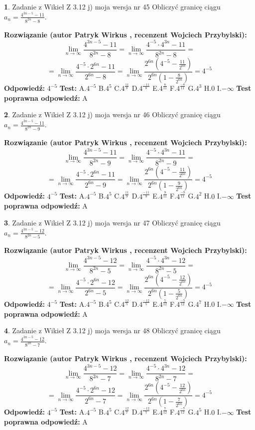 \documentclass[12pt, a4paper]{article}
\theoremstyle{definition} %
\newtheorem{zad}{}
\newcommand{\zadStart}[1]{\begin{zad}#1\newline}
\newcommand{\zadStop}{\end{zad}}
\newcommand{\rozwStart}[2]{\noindent \textbf{Rozwiązanie (autor #1 , recenzent #2): }\newline}
\newcommand{\rozwStop}{\newline}
\newcommand{\odpStart}{\noindent \textbf{Odpowiedź:}\newline}
\newcommand{\odpStop}{\newline}
\newcommand{\testStart}{\noindent \textbf{Test:}\newline}
\newcommand{\testStop}{\newline}
\newcommand{\kluczStart}{\noindent \textbf{Test poprawna odpowiedź:}\newline}
\newcommand{\kluczStop}{\newline}
\begin{document}
\zadStart{Zadanie z Wikieł Z 3.12 j) moja wersja nr 45}
Obliczyć granicę ciągu $a_{n}=\frac{4^{3n-5}-11}{8^{2n}-8}$.
\zadStop
\rozwStart{Patryk Wirkus}{Wojciech Przybylski}
$$\lim\limits_{n\to\infty}\frac{4^{3n-5}-11}{8^{2n}-8}= \lim\limits_{n\to\infty}\frac{4^{-5} \cdot 4^{3n}-11}{8^{2n}-8}=$$
$$= \lim\limits_{n\to\infty}\frac{4^{-5} \cdot 2^{6n}-11}{2^{6n}-8}= \lim\limits_{n\to\infty}\frac{2^{6n}(4^{-5} - \frac{11}{2^{6n}})}{2^{6n}(1-\frac{8}{2^{6n}})}= 4^{-5}$$
\rozwStop
\odpStart
$4^{-5}$
\odpStop
\testStart
A.$4^{-5}$
B.$4^{5}$
C.$4^{\frac{11}{8}}$
D.$4^{\frac{-11}{8}}$
E.$4^{\frac{8}{11}}$
F.$4^{\frac{-8}{11}}$
G.$4^{3}$
H.$0$
I.$-\infty$
\testStop
\kluczStart
A
\kluczStop



\zadStart{Zadanie z Wikieł Z 3.12 j) moja wersja nr 46}
Obliczyć granicę ciągu $a_{n}=\frac{4^{3n-5}-11}{8^{2n}-9}$.
\zadStop
\rozwStart{Patryk Wirkus}{Wojciech Przybylski}
$$\lim\limits_{n\to\infty}\frac{4^{3n-5}-11}{8^{2n}-9}= \lim\limits_{n\to\infty}\frac{4^{-5} \cdot 4^{3n}-11}{8^{2n}-9}=$$
$$= \lim\limits_{n\to\infty}\frac{4^{-5} \cdot 2^{6n}-11}{2^{6n}-9}= \lim\limits_{n\to\infty}\frac{2^{6n}(4^{-5} - \frac{11}{2^{6n}})}{2^{6n}(1-\frac{9}{2^{6n}})}= 4^{-5}$$
\rozwStop
\odpStart
$4^{-5}$
\odpStop
\testStart
A.$4^{-5}$
B.$4^{5}$
C.$4^{\frac{11}{9}}$
D.$4^{\frac{-11}{9}}$
E.$4^{\frac{9}{11}}$
F.$4^{\frac{-9}{11}}$
G.$4^{2}$
H.$0$
I.$-\infty$
\testStop
\kluczStart
A
\kluczStop



\zadStart{Zadanie z Wikieł Z 3.12 j) moja wersja nr 47}
Obliczyć granicę ciągu $a_{n}=\frac{4^{3n-5}-12}{8^{2n}-5}$.
\zadStop
\rozwStart{Patryk Wirkus}{Wojciech Przybylski}
$$\lim\limits_{n\to\infty}\frac{4^{3n-5}-12}{8^{2n}-5}= \lim\limits_{n\to\infty}\frac{4^{-5} \cdot 4^{3n}-12}{8^{2n}-5}=$$
$$= \lim\limits_{n\to\infty}\frac{4^{-5} \cdot 2^{6n}-12}{2^{6n}-5}= \lim\limits_{n\to\infty}\frac{2^{6n}(4^{-5} - \frac{12}{2^{6n}})}{2^{6n}(1-\frac{5}{2^{6n}})}= 4^{-5}$$
\rozwStop
\odpStart
$4^{-5}$
\odpStop
\testStart
A.$4^{-5}$
B.$4^{5}$
C.$4^{\frac{12}{5}}$
D.$4^{\frac{-12}{5}}$
E.$4^{\frac{5}{12}}$
F.$4^{\frac{-5}{12}}$
G.$4^{7}$
H.$0$
I.$-\infty$
\testStop
\kluczStart
A
\kluczStop



\zadStart{Zadanie z Wikieł Z 3.12 j) moja wersja nr 48}
Obliczyć granicę ciągu $a_{n}=\frac{4^{3n-5}-12}{8^{2n}-7}$.
\zadStop
\rozwStart{Patryk Wirkus}{Wojciech Przybylski}
$$\lim\limits_{n\to\infty}\frac{4^{3n-5}-12}{8^{2n}-7}= \lim\limits_{n\to\infty}\frac{4^{-5} \cdot 4^{3n}-12}{8^{2n}-7}=$$
$$= \lim\limits_{n\to\infty}\frac{4^{-5} \cdot 2^{6n}-12}{2^{6n}-7}= \lim\limits_{n\to\infty}\frac{2^{6n}(4^{-5} - \frac{12}{2^{6n}})}{2^{6n}(1-\frac{7}{2^{6n}})}= 4^{-5}$$
\rozwStop
\odpStart
$4^{-5}$
\odpStop
\testStart
A.$4^{-5}$
B.$4^{5}$
C.$4^{\frac{12}{7}}$
D.$4^{\frac{-12}{7}}$
E.$4^{\frac{7}{12}}$
F.$4^{\frac{-7}{12}}$
G.$4^{5}$
H.$0$
I.$-\infty$
\testStop
\kluczStart
A
\kluczStop
\end{document}
